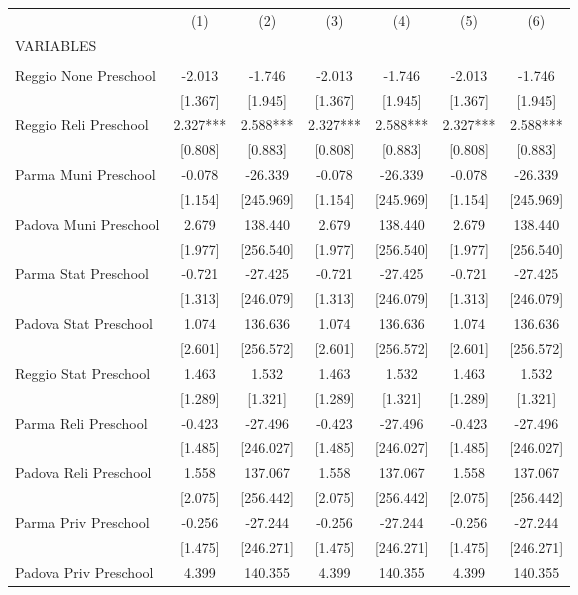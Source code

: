 \begin{tabular}{lcccccc} \hline
 & (1) & (2) & (3) & (4) & (5) & (6) \\
VARIABLES &  &  &  &  &  &  \\ \hline
 &  &  &  &  &  &  \\
Reggio None Preschool & -2.013 & -1.746 & -2.013 & -1.746 & -2.013 & -1.746 \\
 & [1.367] & [1.945] & [1.367] & [1.945] & [1.367] & [1.945] \\
Reggio Reli Preschool & 2.327*** & 2.588*** & 2.327*** & 2.588*** & 2.327*** & 2.588*** \\
 & [0.808] & [0.883] & [0.808] & [0.883] & [0.808] & [0.883] \\
Parma Muni Preschool & -0.078 & -26.339 & -0.078 & -26.339 & -0.078 & -26.339 \\
 & [1.154] & [245.969] & [1.154] & [245.969] & [1.154] & [245.969] \\
Padova Muni Preschool & 2.679 & 138.440 & 2.679 & 138.440 & 2.679 & 138.440 \\
 & [1.977] & [256.540] & [1.977] & [256.540] & [1.977] & [256.540] \\
Parma Stat Preschool & -0.721 & -27.425 & -0.721 & -27.425 & -0.721 & -27.425 \\
 & [1.313] & [246.079] & [1.313] & [246.079] & [1.313] & [246.079] \\
Padova Stat Preschool & 1.074 & 136.636 & 1.074 & 136.636 & 1.074 & 136.636 \\
 & [2.601] & [256.572] & [2.601] & [256.572] & [2.601] & [256.572] \\
Reggio Stat Preschool & 1.463 & 1.532 & 1.463 & 1.532 & 1.463 & 1.532 \\
 & [1.289] & [1.321] & [1.289] & [1.321] & [1.289] & [1.321] \\
Parma Reli Preschool & -0.423 & -27.496 & -0.423 & -27.496 & -0.423 & -27.496 \\
 & [1.485] & [246.027] & [1.485] & [246.027] & [1.485] & [246.027] \\
Padova Reli Preschool & 1.558 & 137.067 & 1.558 & 137.067 & 1.558 & 137.067 \\
 & [2.075] & [256.442] & [2.075] & [256.442] & [2.075] & [256.442] \\
Parma Priv Preschool & -0.256 & -27.244 & -0.256 & -27.244 & -0.256 & -27.244 \\
 & [1.475] & [246.271] & [1.475] & [246.271] & [1.475] & [246.271] \\
Padova Priv Preschool & 4.399 & 140.355 & 4.399 & 140.355 & 4.399 & 140.355 \\

\end{tabular}
